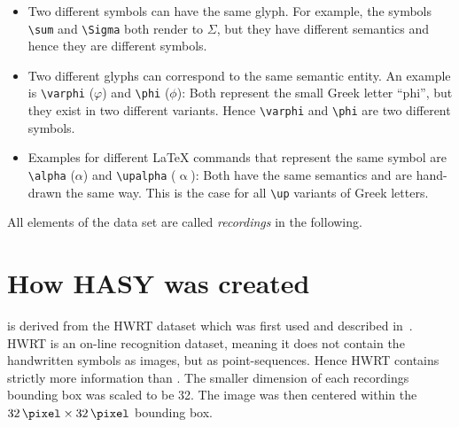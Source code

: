 \begin{itemize}
    \item Two different symbols can have the same glyph. For example, the symbols
\verb+\sum+ and \verb+\Sigma+ both render to $\Sigma$, but they have different
semantics and hence they are different symbols.
    \item Two different glyphs can correspond to the same semantic entity. An example is
\verb+\varphi+ ($\varphi$) and \verb+\phi+ ($\phi$): Both represent the small
Greek letter \enquote{phi}, but they exist in two different variants. Hence
\verb+\varphi+ and \verb+\phi+ are two different symbols.
    \item Examples for different \LaTeX{} commands that represent the same symbol are
          \verb+\alpha+ ($\alpha$) and \verb+\upalpha+ ($\upalpha$): Both have the same
semantics and are hand-drawn the same way. This is the case for all \verb+\up+
variants of Greek letters.
\end{itemize}

All elements of the data set are called \textit{recordings} in the following.


\section{How HASY was created}
\dbName{} is derived from the HWRT dataset which was first used and described
in~\cite{Thoma:2014}. HWRT is an on-line recognition dataset, meaning it does
not contain the handwritten symbols as images, but as point-sequences. Hence
HWRT contains strictly more information than \dbName. The smaller dimension
of each recordings bounding box was scaled to be \SI{32}{\pixel}. The image
was then centered within the $\SI{32}{\pixel} \times \SI{32}{\pixel}$ bounding
box.

